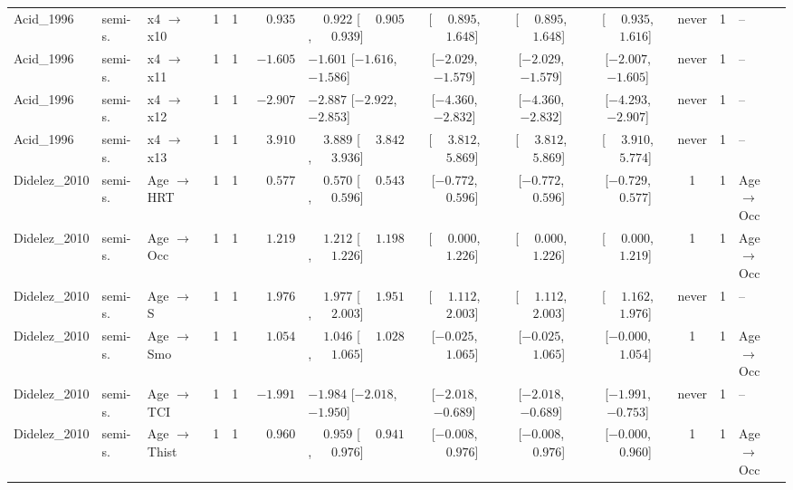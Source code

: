 \begin{landscape}
\begin{longtable}{@{}llp{2.15cm}ccrl cccc c l@{}}
Acid\_1996 & semi-s. & x4 $\to$ x10 & 1 & 1 & $\phantom{-}0.935$ & $\phantom{-}0.922$ [$\phantom{-}0.905$, $\phantom{-}0.939$] & [$\phantom{-}0.895$, $\phantom{-}1.648$] & [$\phantom{-}0.895$, $\phantom{-}1.648$] & [$\phantom{-}0.935$, $\phantom{-}1.616$] & never & 1 & -- \\
Acid\_1996 & semi-s. & x4 $\to$ x11 & 1 & 1 & $-1.605$ & $-1.601$ [$-1.616$, $-1.586$] & [$-2.029$, $-1.579$] & [$-2.029$, $-1.579$] & [$-2.007$, $-1.605$] & never & 1 & -- \\
Acid\_1996 & semi-s. & x4 $\to$ x12 & 1 & 1 & $-2.907$ & $-2.887$ [$-2.922$, $-2.853$] & [$-4.360$, $-2.832$] & [$-4.360$, $-2.832$] & [$-4.293$, $-2.907$] & never & 1 & -- \\
Acid\_1996 & semi-s. & x4 $\to$ x13 & 1 & 1 & $\phantom{-}3.910$ & $\phantom{-}3.889$ [$\phantom{-}3.842$, $\phantom{-}3.936$] & [$\phantom{-}3.812$, $\phantom{-}5.869$] & [$\phantom{-}3.812$, $\phantom{-}5.869$] & [$\phantom{-}3.910$, $\phantom{-}5.774$] & never & 1 & -- \\
Didelez\_2010 & semi-s. & Age $\to$ HRT & 1 & 1 & $\phantom{-}0.577$ & $\phantom{-}0.570$ [$\phantom{-}0.543$, $\phantom{-}0.596$] & [$-0.772$, $\phantom{-}0.596$] & [$-0.772$, $\phantom{-}0.596$] & [$-0.729$, $\phantom{-}0.577$] & 1 & 1 & Age$\to$Occ \\
Didelez\_2010 & semi-s. & Age $\to$ Occ & 1 & 1 & $\phantom{-}1.219$ & $\phantom{-}1.212$ [$\phantom{-}1.198$, $\phantom{-}1.226$] & [$\phantom{-}0.000$, $\phantom{-}1.226$] & [$\phantom{-}0.000$, $\phantom{-}1.226$] & [$\phantom{-}0.000$, $\phantom{-}1.219$] & 1 & 1 & Age$\to$Occ \\
Didelez\_2010 & semi-s. & Age $\to$ S & 1 & 1 & $\phantom{-}1.976$ & $\phantom{-}1.977$ [$\phantom{-}1.951$, $\phantom{-}2.003$] & [$\phantom{-}1.112$, $\phantom{-}2.003$] & [$\phantom{-}1.112$, $\phantom{-}2.003$] & [$\phantom{-}1.162$, $\phantom{-}1.976$] & never & 1 & -- \\
Didelez\_2010 & semi-s. & Age $\to$ Smo & 1 & 1 & $\phantom{-}1.054$ & $\phantom{-}1.046$ [$\phantom{-}1.028$, $\phantom{-}1.065$] & [$-0.025$, $\phantom{-}1.065$] & [$-0.025$, $\phantom{-}1.065$] & [$-0.000$, $\phantom{-}1.054$] & 1 & 1 & Age$\to$Occ \\
Didelez\_2010 & semi-s. & Age $\to$ TCI & 1 & 1 & $-1.991$ & $-1.984$ [$-2.018$, $-1.950$] & [$-2.018$, $-0.689$] & [$-2.018$, $-0.689$] & [$-1.991$, $-0.753$] & never & 1 & -- \\
Didelez\_2010 & semi-s. & Age $\to$ Thist & 1 & 1 & $\phantom{-}0.960$ & $\phantom{-}0.959$ [$\phantom{-}0.941$, $\phantom{-}0.976$] & [$-0.008$, $\phantom{-}0.976$] & [$-0.008$, $\phantom{-}0.976$] & [$-0.000$, $\phantom{-}0.960$] & 1 & 1 & Age$\to$Occ \\

\end{longtable}
\end{landscape}
